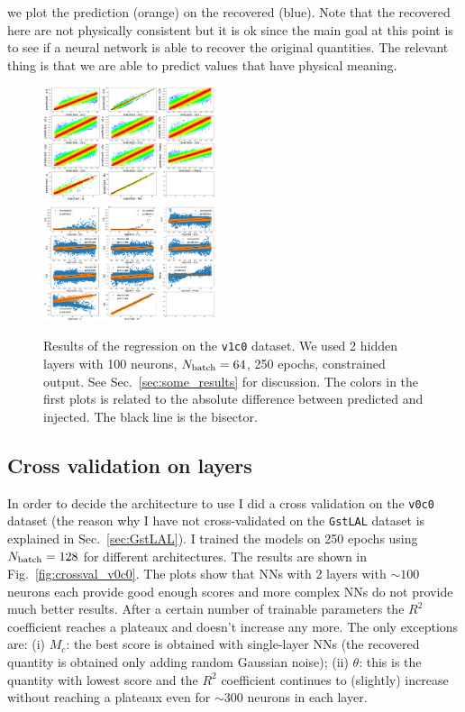 \documentclass[prd,aps,twocolumn,a4paper,showkeys,nofootinbib]{revtex4-1}
\begin{document}
we plot the prediction (orange) on the recovered (blue). Note that the recovered here are not 
physically consistent but it is ok since the main goal at this point 
is to see if a neural network is able to 
recover the original quantities. The relevant thing is that we are able to predict values
that have physical meaning.
%
\begin{figure}[]
  \center
  \includegraphics[width=0.45\textwidth]{./Figs/v1c0_regression.png}\\
  \includegraphics[width=0.45\textwidth]{./Figs/v1c0_regression_noise.png}
  \caption{\label{fig:v1c0_results} Results of the regression on the \texttt{v1c0}
  dataset. We used 2 hidden layers with 100 neurons, $N_{\rm batch}=64$, 250 epochs,  
  constrained output. See Sec.~\ref{sec:some_results} for discussion.
  The colors in the first plots is related to the absolute difference between predicted 
  and injected. The black line is the bisector.}
\end{figure}
%

\subsection{Cross validation on layers}
\label{sec:crossval}
In order to decide the architecture to use I did a cross validation on the 
\texttt{v0c0} dataset (the reason why I have not cross-validated on the \texttt{GstLAL} dataset
is explained in Sec.~\ref{sec:GstLAL}). I trained the models on 250 epochs using
$N_{\rm batch}=128$ for different architectures. The results are shown 
in Fig.~\ref{fig:crossval_v0c0}. The plots show that NNs with 2 layers with $\sim 100$ 
neurons each provide good enough scores and more complex NNs do not provide much better results. 
After a certain number of trainable parameters the $R^2$ coefficient reaches a plateaux 
and doesn't increase any more. 
The only exceptions are: (i) $M_c$: the best score is obtained with single-layer NNs 
(the recovered quantity is obtained only adding random Gaussian noise); 
(ii) $\theta$: this is the quantity with lowest score and the $R^2$ coefficient 
continues to (slightly) increase without reaching a plateaux even for $\sim 300$
neurons in each layer. 
\end{document}
